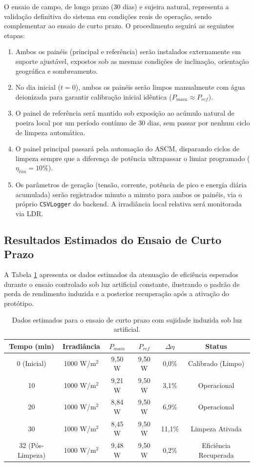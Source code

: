 \documentclass[12pt, a4paper]{article}
\begin{document}
O ensaio de campo, de longo prazo (30 dias) e sujeira natural, representa a validação definitiva do sistema em condições reais de operação, sendo complementar ao ensaio de curto prazo. O procedimento seguirá as seguintes etapas:
\begin{enumerate}
    \item Ambos os painéis (principal e referência) serão instalados externamente em suporte ajustável, expostos sob as mesmas condições de inclinação, orientação geográfica e sombreamento.
    \item No dia inicial ($t=0$), ambos os painéis serão limpos manualmente com água deionizada para garantir calibração inicial idêntica ($P_{main} \approx P_{ref}$).
    \item O painel de referência será mantido sob exposição ao acúmulo natural de poeira local por um período contínuo de 30 dias, sem passar por nenhum ciclo de limpeza automática.
    \item O painel principal passará pela automação do ASCM, disparando ciclos de limpeza sempre que a diferença de potência ultrapassar o limiar programado ($\eta_{lim} = 10\%$).
    \item Os parâmetros de geração (tensão, corrente, potência de pico e energia diária acumulada) serão registrados minuto a minuto para ambos os painéis, via o próprio \texttt{CSVLogger} do backend. A irradiância local relativa será monitorada via LDR.
\end{enumerate}

\subsection{Resultados Estimados do Ensaio de Curto Prazo}

A Tabela \ref{tab:ensaio_soiling} apresenta os dados estimados da atenuação de eficiência esperados durante o ensaio controlado sob luz artificial constante, ilustrando o padrão de perda de rendimento induzida e a posterior recuperação após a ativação do protótipo.

\begin{table}[htbp]
    \centering
    \caption{Dados estimados para o ensaio de curto prazo com sujidade induzida sob luz artificial.}
    \label{tab:ensaio_soiling}
    \begin{tabular}{cccccc}
    \toprule
    \textbf{Tempo (min)} & \textbf{Irradiância} & \textbf{$P_{main}$} & \textbf{$P_{ref}$} & \textbf{$\Delta \eta$} & \textbf{Status} \\
    \midrule
    0 (Inicial) & 1000 W/m$^2$ & 9,50 W & 9,50 W & 0,0\% & Calibrado (Limpo) \\
    10 & 1000 W/m$^2$ & 9,21 W & 9,50 W & 3,1\% & Operacional \\
    20 & 1000 W/m$^2$ & 8,84 W & 9,50 W & 6,9\% & Operacional \\
    30 & 1000 W/m$^2$ & 8,45 W & 9,50 W & 11,1\% & Limpeza Ativada \\
    32 (Pós-Limpeza) & 1000 W/m$^2$ & 9,48 W & 9,50 W & 0,2\% & Eficiência Recuperada \\
    \bottomrule
    \end{tabular}
\end{table}
\end{document}

